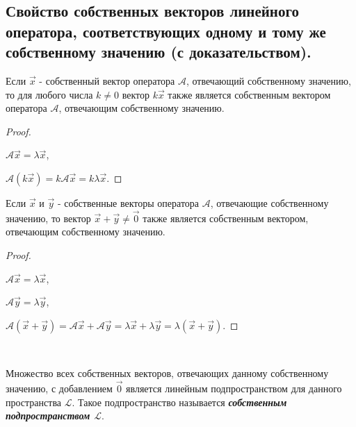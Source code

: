 \subsection{
    Свойство собственных векторов линейного оператора, соответствующих одному и тому же собственному значению (с доказательством).
}

Если $\vec{x}$ - собственный вектор оператора $\mathscr{A}$, отвечающий собственному значению, то для любого числа $k \ne 0$ вектор $k\vec{x}$ также является собственным вектором оператора $\mathscr{A}$, отвечающим собственному значению.

\begin{proof}~

    $\mathscr{A}\vec{x} = \lambda\vec{x}$,
    
    $\mathscr{A}(k\vec{x}) = k\mathscr{A}\vec{x} = k\lambda\vec{x}$.
\end{proof}

Если $\vec{x}$ и $\vec{y}$ - собственные векторы оператора $\mathscr{A}$, отвечающие собственному значению, то вектор $\vec{x} + \vec{y} \ne \vec{0}$ также является собственным вектором, отвечающим собственному значению.

\begin{proof}~

    $\mathscr{A}\vec{x} = \lambda\vec{x}$,
    
    $\mathscr{A}\vec{y} = \lambda\vec{y}$,
    
    $\mathscr{A}(\vec{x} + \vec{y}) = \mathscr{A}\vec{x} + \mathscr{A}\vec{y} = \lambda\vec{x} + \lambda\vec{y} = \lambda(\vec{x} + \vec{y})$.
\end{proof}

\begin{corollary}[свойство]~

    Множество всех собственных векторов, отвечающих данному собственному значению, с добавлением $\vec{0}$ является линейным подпространством для данного пространства $\mathcal{L}$. Такое подпространство называется \textbf{\textit{собственным подпространством $\mathcal{L}$}}.
\end{corollary}

